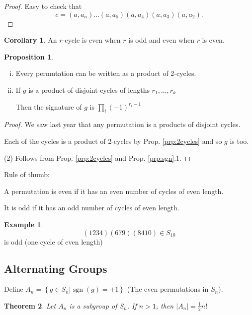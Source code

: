 \documentclass{article}
\newtheorem{theorem}{Theorem}
\theoremstyle{definition} \newtheorem*{definition}{Definition}
\newtheorem{proposition}[theorem]{Proposition}
\newtheorem*{corollary}{Corollary} \newtheorem*{remark}{Remark}
\newtheorem*{exmp}{Example} \newtheorem*{exmps}{Examples}
\DeclareMathOperator{\sgn}{sgn} \DeclareMathOperator{\id}{id}
\begin{document}
\begin{proof} Easy to check that
  $$c=(a,a_n)\ldots(a,a_5)(a,a_4)(a,a_3)(a,a_2).$$ \end{proof}

\begin{corollary} An $r$-cycle is even when $r$ is odd and even when $r$ is
  even.\\ \end{corollary}

\begin{proposition}\hfill \begin{enumerate}[(i)] \item Every permutation can be
        written as a product of 2-cycles.  \item If $g$ is a product of
          disjoint cycles of lengths $r_1, \ldots, r_k$

      Then the signature of $g$ is $\prod_{i} (-1)^{r_i - 1}$ \end{enumerate}
\end{proposition}

\begin{proof} We saw last year that any permutation is a products of disjoint
  cycles.

  Each of the cycles is a product of 2-cycles by Prop. \ref{prp:2cycles} and so
  $g$ is too.

  (2) Follows from Prop. \ref{prp:2cycles} and Prop. \ref{prp:sgn}.1.
\end{proof}

Rule of thumb:

A permutation is even if it has an even number of cycles of even length.

It is odd if it has an odd number of cycles of even length.\\

\begin{exmp} $$(1 2 3 4)(6 7 9)(8 4 10) \in S_{10}$$ is odd (one cycle of even
  length) \end{exmp}


\subsection{Alternating Groups}

Define $A_n=\left\{ g \in S_n | \sgn(g) = +1 \right\}$ (The even permutations
in $S_n$).\\

\begin{theorem} Let $A_n$ is a subgroup of $S_n$. If $n>1$, then
  $|A_n|=\frac{1}{2}n!$ \label{thm:subgroup} \end{theorem}
\end{document}
